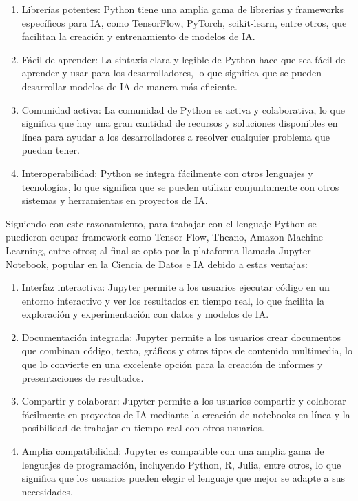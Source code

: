 \begin{enumerate}
	\item Librerías potentes: Python tiene una amplia gama de librerías y frameworks específicos para IA, como TensorFlow, PyTorch, scikit-learn, entre otros, que facilitan la creación y entrenamiento de modelos de IA.
	\item Fácil de aprender: La sintaxis clara y legible de Python hace que sea fácil de aprender y usar para los desarrolladores, lo que significa que se pueden desarrollar modelos de IA de manera más eficiente.
	\item Comunidad activa: La comunidad de Python es activa y colaborativa, lo que significa que hay una gran cantidad de recursos y soluciones disponibles en línea para ayudar a los desarrolladores a resolver cualquier problema que puedan tener.
	\item Interoperabilidad: Python se integra fácilmente con otros lenguajes y tecnologías, lo que significa que se pueden utilizar conjuntamente con otros sistemas y herramientas en proyectos de IA.\\
\end{enumerate}

\par Siguiendo con este razonamiento, para trabajar con el lenguaje Python se puedieron ocupar framework como Tensor Flow, Theano, Amazon Machine Learning, entre otros; al final se opto por la plataforma llamada Jupyter Notebook, popular en la Ciencia de Datos e IA debido a estas ventajas:

\begin{enumerate}
	\item Interfaz interactiva: Jupyter permite a los usuarios ejecutar código en un entorno interactivo y ver los resultados en tiempo real, lo que facilita la exploración y experimentación con datos y modelos de IA.
	\item Documentación integrada: Jupyter permite a los usuarios crear documentos que combinan código, texto, gráficos y otros tipos de contenido multimedia, lo que lo convierte en una excelente opción para la creación de informes y presentaciones de resultados.
	\item Compartir y colaborar: Jupyter permite a los usuarios compartir y colaborar fácilmente en proyectos de IA mediante la creación de notebooks en línea y la posibilidad de trabajar en tiempo real con otros usuarios.
	\item Amplia compatibilidad: Jupyter es compatible con una amplia gama de lenguajes de programación, incluyendo Python, R, Julia, entre otros, lo que significa que los usuarios pueden elegir el lenguaje que mejor se adapte a sus necesidades.\\
\end{enumerate}













